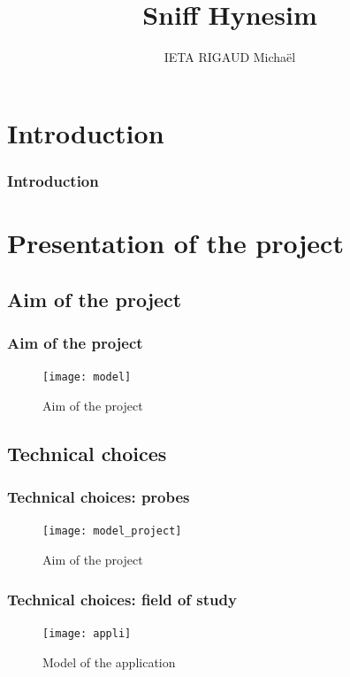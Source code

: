 \documentclass[10pt, svgnames, compress, red]{beamer}
\institute{ENSTA Bretagne}
\title{Sniff Hynesim}
\subtitle{}
\author{IETA RIGAUD Michaël}
\begin{document}
\begin{frame}
  \titlepage
  \transdissolve[duration=0.1]
\end{frame}


\section{Introduction}
\begin{frame}
  \frametitle{Introduction}
  \transdissolve[duration=0.1]
\end{frame}


\section{Presentation of the project}

\subsection{Aim of the project}
\begin{frame}
  \frametitle{Aim of the project}
  \begin{figure}[h]
    \centering
    \texttt{[image: model]}
    \caption{Aim of the project}
  \end{figure}
\end{frame}

\subsection{Technical choices}
\begin{frame}
  \frametitle{Technical choices: probes}
  \begin{figure}[h]
    \centering
    \texttt{[image: model\_project]}
    \caption{Aim of the project}
  \end{figure}
\end{frame}



\begin{frame}
  \frametitle{Technical choices: field of study}
  \begin{figure}[h]
    \centering
    \texttt{[image: appli]}
    \caption{Model of the application}
    \label{fig:model}
  \end{figure}
\end{frame}
\end{document}

